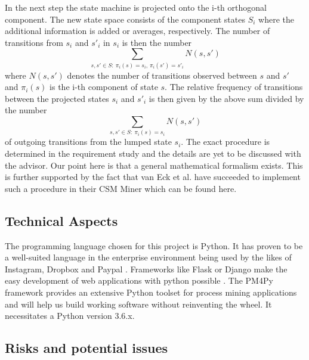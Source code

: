 \documentclass[12pt]{extarticle}
\begin{document}
In the next step the state machine is projected onto the i-th orthogonal component. The new state space consists of the component states $S_i$ where the additional information is added or averages, respectively. The number of transitions from $s_i$ and $s'_i$ in $s_i$ is then the number
\[ \sum_{s,s' \in S:\ \pi_i(s) = s_i,\, \pi_i(s') = s'_i} N(s,s') \]
where $N(s,s')$ denotes the number of transitions observed between $s$ and $s'$ and $\pi_i(s)$ is the i-th component of state $s$. The relative frequency of transitions between the projected states $s_i$ and $s'_i$ is then given by the above sum divided by the number
\[
    \sum_{s,s' \in S:\ \pi_i(s) = s_i} N(s,s')
\]
of outgoing transitions from the lumped state $s_i$. The exact procedure is determined in the requirement study and the details are yet to be discussed with the advisor. Our point here is that a general mathematical formalism exists. This is further supported by the fact that van Eck et al. have succeeded to implement such a procedure in their CSM Miner which can be found here\cite{prom}.

\subsection{Technical Aspects}

The programming language chosen for this project is Python. It has proven to be a well-suited language in the enterprise environment being used by the likes of Instagram, Dropbox and Paypal \cite{danjou}. Frameworks like Flask or Django make the easy development of web applications with python possible \cite{framework}. The PM4Py framework provides an extensive Python toolset for process mining applications and will help us build working software without reinventing the wheel. It necessitates a Python version 3.6.x.

\subsection{Risks and potential issues}
\end{document}

